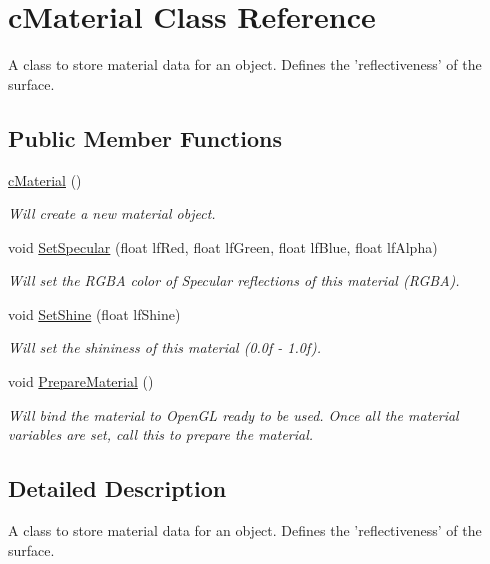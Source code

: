 \hypertarget{classc_material}{
\section{cMaterial Class Reference}
\label{classc_material}
}


A class to store material data for an object. Defines the 'reflectiveness' of the surface.  


\subsection*{Public Member Functions}
\begin{DoxyCompactItemize}
\item 
\hypertarget{classc_material_acccfb25dd445a8279f0452dbe53f5079}{
\hyperlink{classc_material_acccfb25dd445a8279f0452dbe53f5079}{cMaterial} ()}
\label{classc_material_acccfb25dd445a8279f0452dbe53f5079}

\begin{DoxyCompactList}\small\item\em Will create a new material object. \end{DoxyCompactList}\item 
\hypertarget{classc_material_aa08385e14417f023b8529ec491f5df38}{
void \hyperlink{classc_material_aa08385e14417f023b8529ec491f5df38}{SetSpecular} (float lfRed, float lfGreen, float lfBlue, float lfAlpha)}
\label{classc_material_aa08385e14417f023b8529ec491f5df38}

\begin{DoxyCompactList}\small\item\em Will set the RGBA color of Specular reflections of this material (RGBA). \end{DoxyCompactList}\item 
\hypertarget{classc_material_a7b3a800d84e017b955fd9faa9d7fda15}{
void \hyperlink{classc_material_a7b3a800d84e017b955fd9faa9d7fda15}{SetShine} (float lfShine)}
\label{classc_material_a7b3a800d84e017b955fd9faa9d7fda15}

\begin{DoxyCompactList}\small\item\em Will set the shininess of this material (0.0f -\/ 1.0f). \end{DoxyCompactList}\item 
\hypertarget{classc_material_af08e6f579a6c0e41490721320355a2f4}{
void \hyperlink{classc_material_af08e6f579a6c0e41490721320355a2f4}{PrepareMaterial} ()}
\label{classc_material_af08e6f579a6c0e41490721320355a2f4}

\begin{DoxyCompactList}\small\item\em Will bind the material to OpenGL ready to be used. Once all the material variables are set, call this to prepare the material. \end{DoxyCompactList}\end{DoxyCompactItemize}


\subsection{Detailed Description}
A class to store material data for an object. Defines the 'reflectiveness' of the surface. 